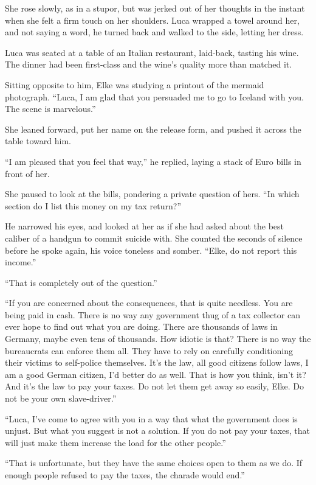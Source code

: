 She rose slowly, as in a stupor, but was jerked out of her thoughts in the instant when she felt a firm touch on her shoulders. Luca wrapped a towel around her, and not saying a word, he turned back and walked to the side, letting her dress.

\sectionline

Luca was seated at a table of an Italian restaurant, laid-back, tasting his wine. The dinner had been first-class and the wine's quality more than matched it.

Sitting opposite to him, Elke was studying a printout of the mermaid photograph. ``Luca, I am glad that you persuaded me to go to Iceland with you. The scene is marvelous.''

She leaned forward, put her name on the release form, and pushed it across the table toward him.

``I am pleased that you feel that way,'' he replied, laying a stack of Euro bills in front of her.

She paused to look at the bills, pondering a private question of hers. ``In which section do I list this money on my tax return?''

He narrowed his eyes, and looked at her as if she had asked about the best caliber of a handgun to commit suicide with. She counted the seconds of silence before he spoke again, his voice toneless and somber. ``Elke, do not report this income.''

``That is completely out of the question.''

``If you are concerned about the consequences, that is quite needless. You are being paid in cash. There is no way any government thug of a tax collector can ever hope to find out what you are doing. There are thousands of laws in Germany, maybe even tens of thousands. How idiotic is that? There is no way the bureaucrats can enforce them all. They have to rely on carefully conditioning their victims to self-police themselves. It's the law, all good citizens follow laws, I am a good German citizen, I'd better do as well. That is how you think, isn't it? And it's the law to pay your taxes. Do not let them get away so easily, Elke. Do not be your own slave-driver.''

``Luca, I've come to agree with you in a way that what the government does is unjust. But what you suggest is not a solution. If you do not pay your taxes, that will just make them increase the load for the other people.''

``That is unfortunate, but they have the same choices open to them as we do. If enough people refused to pay the taxes, the charade would end.''

